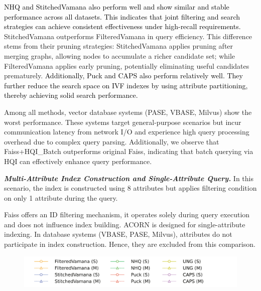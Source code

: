 \documentclass[sigconf, nonacm, pdfa]{acmart}
\begin{document}
{	\textcolor{black}{NHQ and StitchedVamana also perform well and show similar and stable performance across all datasets. This indicates that joint filtering and search strategies can achieve consistent effectiveness under high-recall requirements.} StitchedVamana outperforms FilteredVamana in query efficiency. This difference stems from their pruning strategies: StitchedVamana applies pruning after merging graphs, allowing nodes to accumulate a richer candidate set; while FilteredVamana applies early pruning, potentially eliminating useful candidates prematurely.
	\textcolor{black}{Additionally, Puck and CAPS also perform relatively well. They further reduce the search space on IVF indexes by using attribute partitioning, thereby achieving solid search performance.}
	
	Among all methods, vector database systems (PASE, VBASE, Milvus) show the worst performance. These systems target general-purpose scenarios but incur communication latency from network I/O and experience high query processing overhead due to complex query parsing. Additionally, we observe that Faiss+HQI\_Batch outperforms original Faiss, indicating that batch querying via HQI can effectively enhance query performance.
	

	
	\textit{\textbf{Multi-Attribute Index Construction and Single-Attribute Query.}}
	In this scenario, the index is constructed using 8 attributes but applies filtering condition on only 1 attribute during the query.
	
	Faiss offers an ID filtering mechanism, it operates solely during query execution and does not influence index building. ACORN is   designed for single-attribute indexing. In database systems (VBASE, PASE, Milvus), 
	attributes do not participate in index construction.
	Hence, they are excluded from this comparison.
	
	\begin{figure}[t]
		\centering
		\setlength{\abovecaptionskip}{0.15cm}
		\setlength{\belowcaptionskip}{-0.10cm}
		\hspace*{15pt} %
		\includegraphics[width=0.85\columnwidth]{figures/exp/exp_2_legend.pdf} %
		

\end{figure}}
\end{document}
